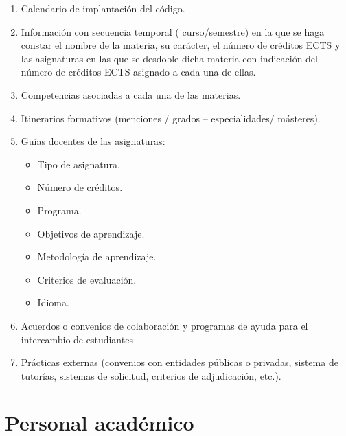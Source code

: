 \begin{enumerate}

    \item Calendario de implantación del código.

    \item Información con secuencia temporal ( curso/semestre) en la que se haga
        constar el nombre de la materia, su carácter, el número de créditos ECTS
        y las asignaturas en las que se desdoble dicha materia con indicación del
        número de créditos ECTS asignado a cada una de ellas.

    \item Competencias asociadas a cada una de las materias.

    \item Itinerarios formativos (menciones / grados – especialidades/ másteres).

    \item Guías docentes de las asignaturas:

        \begin{itemize}

            \item Tipo de asignatura.
            \item Número de créditos.
            \item Programa.
            \item Objetivos de aprendizaje.
            \item Metodología de aprendizaje.
            \item Criterios de evaluación.
            \item Idioma.

        \end{itemize}

    \item Acuerdos o convenios de colaboración y programas de ayuda para el
        intercambio de estudiantes

    \item Prácticas externas (convenios con entidades públicas o privadas, sistema
        de tutorías, sistemas de solicitud, criterios de adjudicación, etc.).


\end{enumerate}

\section{Personal académico}

